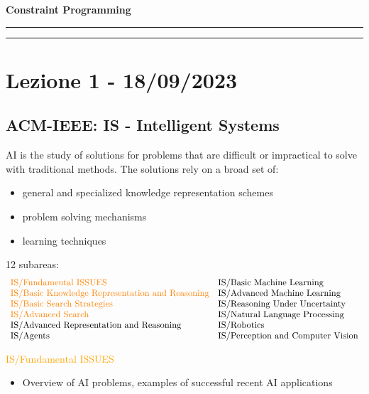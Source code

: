 \documentclass[11pt]{article}
\begin{document}
\begin{center}
    \LARGE \textbf{Constraint Programming}
\end{center}

\vspace{0.5cm}
\hrule
\vspace{0.5cm}

\tableofcontents

\vspace{0.5cm}
\hrule
\vspace{0.5cm}

\section{Lezione 1 - 18/09/2023}
\subsection{ACM-IEEE: IS - Intelligent Systems}
    AI is the study of solutions for problems that are difficult or impractical to solve with traditional methods. The solutions rely on a broad set of:
    \begin{itemize}
        \item general and specialized knowledge representation schemes
        \item problem solving mechanisms
        \item learning techniques
    \end{itemize}

    12 subareas:
    $$\begin{array}{ll}
        \color{orange}\text{IS/Fundamental ISSUES}  &  \text{IS/Basic Machine Learning} \\
        \color{orange}\text{IS/Basic Knowledge Representation and Reasoning} & \text{IS/Advanced Machine Learning} \\
        \color{orange}\text{IS/Basic Search Strategies} & \text{IS/Reasoning Under Uncertainty} \\
        \color{orange}\text{IS/Advanced Search} & \text{IS/Natural Language Processing} \\
        \text{IS/Advanced Representation and Reasoning} & \text{IS/Robotics} \\
        \text{IS/Agents} & \text{IS/Perception and Computer Vision}
    \end{array}$$

    \textcolor{orange}{IS/Fundamental ISSUES}
    \begin{itemize}
        \item Overview of AI problems, examples of successful recent AI applications
    \end{itemize}
    
\end{document}
